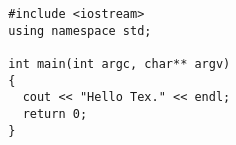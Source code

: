 \documentclass[11pt,UTF8,hyperref,openany]{ctexbook}
\begin{document}
\begin{linenumbers}[2]%
  \newline
\end{linenumbers}

\begin{lstlisting}
  #include <iostream>
  using namespace std;

  int main(int argc, char** argv)
  {
    cout << "Hello Tex." << endl;
    return 0;
  }
\end{lstlisting}
\end{document}

